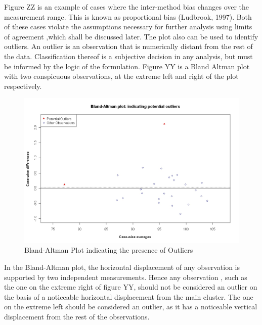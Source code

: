 \documentclass[Chap2main.tex]{subfiles}
\begin{document}
	
	\newpage
	Figure ZZ is an example of cases where the inter-method bias changes over the measurement range. This is known as proportional
	bias (Ludbrook, 1997). Both of these cases violate the assumptions necessary for further analysis using limits of agreement ,which
	shall be discussed later. The plot also can be used to identify outliers. An outlier is an observation that is numerically distant
	from the rest of the data. Classification thereof is a subjective decision in any analysis, but must be informed by the logic of the
	formulation. Figure YY is a Bland Altman plot with two conspicuous observations, at the extreme left and right of the plot
	respectively.
	
	
	\begin{figure}[h!]
		\begin{center}
			\includegraphics[width=125mm]{BAOutliers.jpeg}
			\caption{Bland-Altman Plot indicating the presence of Outliers}\label{PropBias}
		\end{center}
	\end{figure}
	
	In the Bland-Altman plot, the horizontal displacement of any observation is supported by two independent measurements. Hence
	any observation , such as the one on the extreme right of figure YY, should not be considered an outlier on the basis of a
	noticeable horizontal displacement from the main cluster. The one on the extreme left should be considered an outlier, as it has a
	noticeable vertical displacement from the rest of the observations.
	
\end{document}
